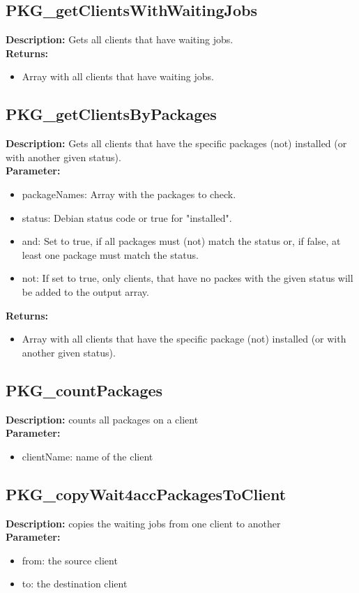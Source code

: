 \subsection{PKG\_getClientsWithWaitingJobs}
\textbf{Description:} Gets all clients that have waiting jobs.\\
\textbf{Returns:}
\begin{itemize}
\item Array with all clients that have waiting jobs.
\end{itemize}

\subsection{PKG\_getClientsByPackages}
\textbf{Description:} Gets all clients that have the specific packages (not) installed (or with another given status).\\
\textbf{Parameter:}
\begin{itemize}
\item packageNames: Array with the packages to check.
\item status: Debian status code or true for "installed".
\item and: Set to true, if all packages must (not) match the status or, if false, at least one package must match the status.
\item not: If set to true, only clients, that have no packes with the given status will be added to the output array.
\end{itemize}
\textbf{Returns:}
\begin{itemize}
\item Array with all clients that have the specific package (not) installed (or with another given status).
\end{itemize}

\subsection{PKG\_countPackages}
\textbf{Description:} counts all packages on a client\\
\textbf{Parameter:}
\begin{itemize}
\item clientName: name of the client 
\end{itemize}

\subsection{PKG\_copyWait4accPackagesToClient}
\textbf{Description:} copies the waiting jobs from one client to another\\
\textbf{Parameter:}
\begin{itemize}
\item from: the source client
\item to: the destination client
\end{itemize}

